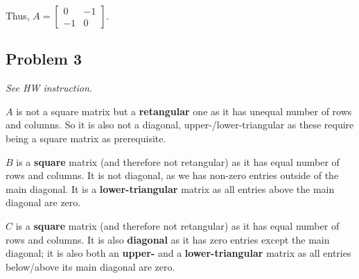 \documentclass[11pt]{article}
\providecommand{\qbm}[1]{\begin{bmatrix} #1 \end{bmatrix}}
\begin{document}
Thus, $A = \qbm{0 & -1 \\ -1 & 0}$.

\subsection*{Problem 3}
\textit{See HW instruction.}\newline

$A$ is not a square matrix but a \textbf{retangular} one as it has unequal number of rows and columns. So it is also not a diagonal, upper-/lower-triangular as these require being a square matrix as prerequisite.

$B$ is a \textbf{square} matrix (and therefore not retangular) as it has equal number of rows and columns. It is not diagonal, as we has non-zero entries outside of the main diagonal. It is a \textbf{lower-triangular} matrix as all entries above the main diagonal are zero.

$C$ is a \textbf{square} matrix (and therefore not retangular) as it has equal number of rows and columns. It is also \textbf{diagonal} as it has zero entries except the main diagonal; it is also both an \textbf{upper-} and a \textbf{lower-triangular} matrix as all entries below/above its main diagonal are zero.
\end{document}

